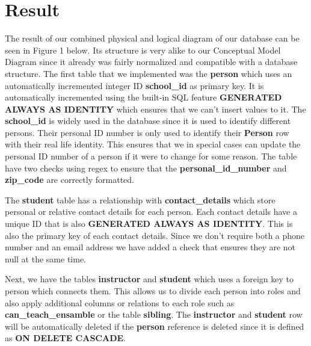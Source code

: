 \documentclass[a4paper]{scrartcl}
\begin{document}
\section{Result}

The result of our combined physical and logical diagram of our database can be seen in Figure 1 below. Its structure is very alike to our Conceptual Model Diagram since it already was fairly normalized and compatible with a database structure. The first table that we implemented was the \textbf{person} which uses an automatically incremented integer ID \textbf{school\_id} as primary key. It is automatically incremented using the built-in SQL feature \textbf{GENERATED ALWAYS AS IDENTITY} which ensures that we can't insert values to it. The \textbf{school\_id} is widely used in the database since it is used to identify different persons. Their personal ID number is only used to identify their \textbf{Person} row with their real life identity. This ensures that we in special cases can update the personal ID number of a person if it were to change for some reason. The table have two checks using regex to ensure that the \textbf{personal\_id\_number} and \textbf{zip\_code} are correctly formatted.

The \textbf{student} table has a relationship with \textbf{contact\_details} which store personal or relative contact details for each person. Each contact details have a unique ID that is also \textbf{GENERATED ALWAYS AS IDENTITY}. This is also the primary key of each contact details. Since we don't require both a phone number and an email address we have added a check that ensures they are not null at the same time.

Next, we have the tables \textbf{instructor} and \textbf{student} which uses a foreign key to person which connects them. This allows us to divide each person into roles and also apply additional columns or relations to each role such as \textbf{can\_teach\_ensamble} or the table \textbf{sibling}. The \textbf{instructor} and \textbf{student} row will be automatically deleted if the \textbf{person} reference is deleted since it is defined as \textbf{ON DELETE CASCADE}.
\end{document}
